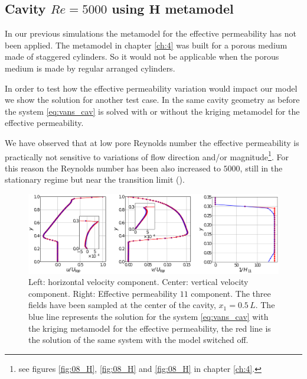 \subsection{Cavity $Re=5000$ using $\mathbf{H}$ metamodel}
\label{pr:mata_cav}
In our previous simulations the metamodel for the effective permeability has not been applied.  The metamodel in chapter \ref{ch:4} was built for a porous medium made of staggered cylinders. So it would not be applicable when the porous medium is made by regular arranged cylinders.

In order to test how the effective permeability variation would impact our model we show the solution for another test case. In the same cavity geometry as before the system \eqref{eq:vans_cav} is solved with or without the kriging metamodel for the effective permeability.

We have observed that at low pore Reynolds number the effective permeability is practically not sensitive to variations of flow direction and/or magnitude\footnote{see figures \ref{fig:08_H}, \ref{fig:08_H} and \ref{fig:08_H} in chapter \ref{ch:4}.}.
For this reason the Reynolds number has been also increased to $5000$, still in the stationary regime but near the transition limit (\citet{peng2003transition}).

\begin{figure}[h]
	\centering
	\includegraphics[width=0.9\linewidth]{chapter_5/figure/cav_5000}
	\caption{Left: horizontal velocity component. Center: vertical velocity component. Right: Effective permeability $11$ component. The three fields have been sampled at the center of the cavity, $x_1=0.5 \,L$. The blue line represents the solution for the system \eqref{eq:vans_cav} with the kriging metamodel for the effective permeability, the red line is the solution of the same system with the model switched off.}
	\label{fig:cav5000}
\end{figure}


